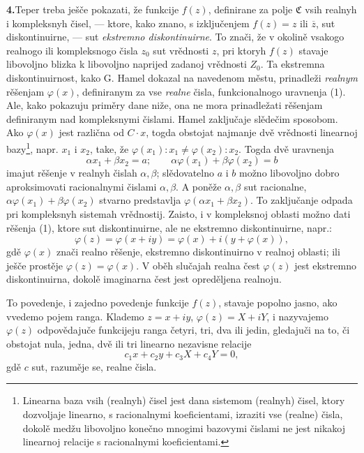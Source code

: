 \documentclass[11pt]{article}
\providecommand{\Cfield}{\mathfrak C}
\begin{document}

\medskip
\noindent\textbf{4.}\quad Teper treba ješče pokazati, že funkcije \(f(z)\), definirane za polje \(\Cfield\) vsih realnyh i kompleksnyh čisel, --- ktore, kako znano, s izključenjem \(f(z)=z\) ili \(\overline z\), sut diskontinuirne, --- sut {\itshape ekstremno diskontinuirne}. To znači, že v okolině vsakogo realnogo ili kompleksnogo čisla \(z_0\) sut vrědnosti \(z\), pri ktoryh \(f(z)\) stavaje libovoljno blizka k libovoljno naprijed zadanoj vrědnosti \(Z_0\). Ta ekstremna diskontinuirnost, kako G. Hamel dokazal na navedenom městu, prinadleži {\itshape realnym} rěšenjam \(\varphi(x)\), definiranym za vse {\itshape realne} čisla, funkcionalnogo uravnenja (1). Ale, kako pokazuju priměry dane niže, ona ne mora prinadležati rěšenjam definiranym nad kompleksnymi čislami. Hamel zaključaje slědečim sposobom. Ako \(\varphi(x)\) jest različna od \(C\cdot x\), togda obstojat najmanje dvě vrědnosti linearnoj bazy\footnote{Linearna baza vsih (realnyh) čisel jest dana sistemom (realnyh) čisel, ktory dozvoljaje linearno, s racionalnymi koeficientami, izraziti vse (realne) čisla, dokolě medžu libovoljno konečno mnogimi bazovymi čislami ne jest nikakoj linearnoj relacije s racionalnymi koeficientami.}, napr. \(x_1\) i \(x_2\), take, že \(\varphi(x_1):x_1\ne\varphi(x_2):x_2\). Togda dvě uravnenja
\[
\alpha x_1+\beta x_2=a;\qquad \alpha\varphi(x_1)+\beta\varphi(x_2)=b
\]
imajut rěšenje v realnyh čislah \(\alpha,\beta\); slědovatelno \(a\) i \(b\) možno libovoljno dobro aproksimovati racionalnymi čislami \(\alpha,\beta\). A poněže \(\alpha,\beta\) sut racionalne, \(\alpha\varphi(x_1)+\beta\varphi(x_2)\) stvarno predstavlja \(\varphi(\alpha x_1+\beta x_2)\). To zaključanje odpada pri kompleksnyh sistemah vrědnostij. Zaisto, i v kompleksnoj oblasti možno dati rěšenja (1), ktore sut diskontinuirne, ale ne ekstremno diskontinuirne, napr.:
\[
\varphi(z)=\varphi(x+iy)=\varphi(x)+i(y+\varphi(x)),
\]
gdě \(\varphi(x)\) znači realno rěšenje, ekstremno diskontinuirno v realnoj oblasti; ili ješče prostěje \(\varphi(z)=\varphi(x)\). V oběh slučajah realna čest \(\varphi(z)\) jest ekstremno diskontinuirna, dokolě imaginarna čest jest opreděljena realnoju.

To povedenje, i zajedno povedenje funkcije \(f(z)\), stavaje popolno jasno, ako vvedemo pojem ranga. Klademo \(z=x+iy\), \(\varphi(z)=X+iY\), i nazyvajemo \(\varphi(z)\) odpovědajuče funkcijeju ranga četyri, tri, dva ili jedin, gledajuči na to, či obstojat nula, jedna, dvě ili tri linearno nezavisne relacije
\[
c_1x+c_2y+c_3X+c_4Y=0,
\]
gdě \(c\) sut, razuměje se, realne čisla.
\end{document}
